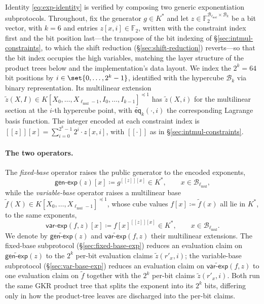 \documentclass{article}
\theoremstyle{definition}
\newcommand*{\mlin}{{\preceq 1}}
\newcommand*{\mle}{\widetilde}
\newcommand{\eq}{\mathsf{eq}}
\newcommand{\BB}{\mathcal{B}}
\newcommand{\FF}[1]{\mathbb{F}_{#1}}
\newcommand{\intval}[1]{[\![#1]\!]}
\begin{document}
Identity \eqref{eq:exp-identity} is verified by composing two generic exponentiation subprotocols. Throughout, fix the generator $g \in K^*$ and let $z \in \FF{2}^{\BB_{\ell_\text{mul}} \times \BB_k}$ be a bit vector, with $k = 6$ and entries $z[x, i] \in \FF{2}$, written with the constraint index first and the bit position last---the transpose of the bit indexing of \S\ref{sec:intmul-constraints}, to which the shift reduction (\S\ref{sec:shift-reduction}) reverts---so that the bit index occupies the high variables, matching the layer structure of the product trees below and the implementation's data layout. We index the $2^k = 64$ bit positions by $i \in \set{0, \ldots, 2^k - 1}$, identified with the hypercube $\BB_k$ via binary representation. Its multilinear extension $\mle{z}(X, I) \in K[X_0, \ldots, X_{\ell_\text{mul} - 1}, I_0, \ldots, I_{k - 1}]^\mlin$ has $\mle{z}(X, i)$ for the multilinear section at the $i$-th hypercube point, with $\mle{\eq}_k(\cdot, i)$ the corresponding Lagrange basis function. The integer encoded at each constraint index is $\intval{z}[x] = \sum_{i = 0}^{2^k - 1} 2^i \cdot z[x, i]$, with $\intval{\cdot}$ as in \S\ref{sec:intmul-constraints}.

\paragraph{The two operators.}
The \emph{fixed-base} operator raises the public generator to the encoded exponents,
\[
  \textsf{gen-exp}(z)[x] \coloneqq g^{\intval{z}[x]} \in K^*, \qquad x \in \BB_{\ell_\text{mul}},
\]
while the \emph{variable-base} operator raises a multilinear base $\mle{f}(X) \in K[X_0, \ldots, X_{\ell_\text{mul} - 1}]^\mlin$, whose cube values $f[x] \coloneqq \mle{f}(x)$ all lie in $K^*$, to the same exponents,
\[
  \textsf{var-exp}(f, z)[x] \coloneqq f[x]^{\intval{z}[x]} \in K^*, \qquad x \in \BB_{\ell_\text{mul}}.
\]
We denote by $\mle{\textsf{gen-exp}}(z)$ and $\mle{\textsf{var-exp}}(f, z)$ their multilinear extensions. The fixed-base subprotocol (\S\ref{sec:fixed-base-exp}) reduces an evaluation claim on $\mle{\textsf{gen-exp}}(z)$ to the $2^k$ per-bit evaluation claims $\mle{z}(r'_x, i)$; the variable-base subprotocol (\S\ref{sec:var-base-exp}) reduces an evaluation claim on $\mle{\textsf{var-exp}}(f, z)$ to one evaluation claim on $\mle{f}$ together with the $2^k$ per-bit claims $\mle{z}(r'_x, i)$. Both run the same GKR product tree that splits the exponent into its $2^k$ bits, differing only in how the product-tree leaves are discharged into the per-bit claims.
\end{document}
